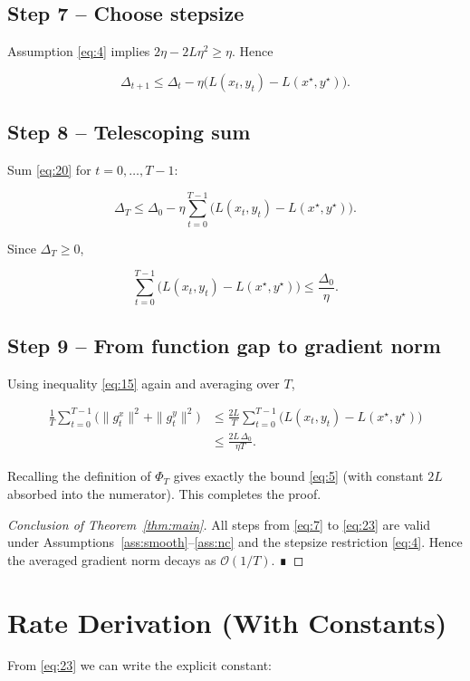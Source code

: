 \documentclass{article}
\begin{document}
\subsection*{Step 7 – Choose stepsize}
Assumption \eqref{eq:4} implies \(2\eta-2L\eta^{2}\ge \eta\). Hence

\[
\Delta_{t+1}
\le \Delta_{t}
-\eta\big(L(x_t,y_t)-L(x^{\star},y^{\star})\big).
\tag{20}
\]

\subsection*{Step 8 – Telescoping sum}
Sum \eqref{eq:20} for \(t=0,\dots,T-1\):

\[
\Delta_{T}
\le \Delta_{0}
-\eta\sum_{t=0}^{T-1}\big(L(x_t,y_t)-L(x^{\star},y^{\star})\big).
\tag{21}
\]

Since \(\Delta_{T}\ge 0\),

\[
\sum_{t=0}^{T-1}\big(L(x_t,y_t)-L(x^{\star},y^{\star})\big)
\le \frac{\Delta_{0}}{\eta}.
\tag{22}
\]

\subsection*{Step 9 – From function gap to gradient norm}
Using inequality \eqref{eq:15} again and averaging over \(T\),

\[
\begin{aligned}
\frac{1}{T}\sum_{t=0}^{T-1}
\big(\|g_t^{x}\|^{2}+\|g_t^{y}\|^{2}\big)
&\le \frac{2L}{T}\sum_{t=0}^{T-1}
\big(L(x_t,y_t)-L(x^{\star},y^{\star})\big)\\[1mm]
&\le \frac{2L\,\Delta_{0}}{\eta T}.
\end{aligned}
\tag{23}
\]

Recalling the definition of \(\Phi_T\) gives exactly the bound \eqref{eq:5} (with constant \(2L\) absorbed into the numerator). This completes the proof.

\begin{proof}[Conclusion of Theorem~\ref{thm:main}]
All steps from \eqref{eq:7} to \eqref{eq:23} are valid under Assumptions~\ref{ass:smooth}–\ref{ass:nc} and the stepsize restriction \eqref{eq:4}. Hence the averaged gradient norm decays as \(\mathcal{O}(1/T)\). ∎
\end{proof}

\section*{Rate Derivation (With Constants)}
From \eqref{eq:23} we can write the explicit constant:
\end{document}

